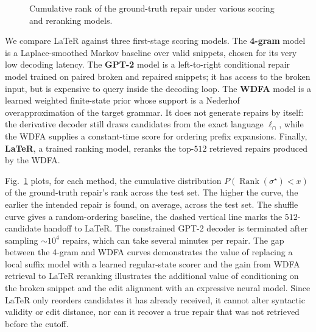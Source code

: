 \documentclass[popl.tex]{subfiles}
\begin{document}
\begin{figure}
  \vspace{-0.35cm}
  
  \vspace{-0.3cm}
  \caption{Cumulative rank of the ground-truth repair under various scoring and reranking models.}
  \label{fig:rank_cdf}
  \vspace{-0.2cm}
\end{figure}

We compare LaTeR against three first-stage scoring models.  The
\textbf{4-gram} model is a Laplace-smoothed Markov baseline over valid snippets, chosen for its very low decoding latency. The \textbf{GPT-2} model is a left-to-right conditional repair model trained on paired broken and repaired snippets; it has access to the broken input, but is expensive to query inside the decoding loop. The \textbf{WDFA} model is a learned weighted finite-state prior whose support is a Nederhof overapproximation of the target grammar. It does not generate repairs by itself: the derivative decoder still draws candidates from the exact language \(\ell_\cap\), while the WDFA supplies a constant-time score for ordering prefix expansions. Finally, \textbf{LaTeR}, a trained ranking model, reranks the top-\(512\) retrieved repairs produced by the WDFA.

Fig.~\ref{fig:rank_cdf} plots, for each method, the cumulative distribution \(P(\operatorname{Rank}(\sigma^\star)<x)\) of the ground-truth repair's rank across the test set. The higher the curve, the earlier the intended repair is found, on average, across the test set. The shuffle curve gives a random-ordering baseline, the dashed vertical line marks the \(512\)-candidate handoff to LaTeR. The constrained GPT-2 decoder is terminated after sampling $\sim 10^4$ repairs, which can take several minutes per repair. The gap between the 4-gram and WDFA curves demonstrates the value of replacing a local suffix model with a learned regular-state scorer and the gain from WDFA retrieval to LaTeR reranking illustrates the additional value of conditioning on the broken snippet and the edit alignment with an expressive neural model. Since LaTeR only reorders candidates it has already received, it cannot alter syntactic validity or edit distance, nor can it recover a true repair that was not retrieved before the cutoff.
\end{document}
